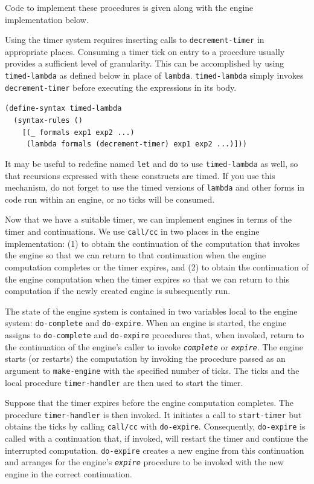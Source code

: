 Code to implement these procedures is given along with the engine
implementation below.


Using the timer system requires inserting calls to \texttt{decrement-timer} in
appropriate places.
Consuming a timer tick on entry to a procedure usually provides a sufficient
level of granularity.
This can be accomplished by using \texttt{timed-lambda} as defined below
in place of \texttt{lambda}.
\texttt{timed-lambda} simply invokes \texttt{decrement-timer} before executing the
expressions in its body.


\begin{alltt}
(define-syntax timed-lambda
  (syntax-rules ()
    [(\_{} formals exp1 exp2 ...)
     (lambda formals (decrement-timer) exp1 exp2 ...)]))
\end{alltt}


It may be useful to redefine named \texttt{let} and \texttt{do} to use \texttt{timed-lambda}
as well, so that recursions expressed with these constructs are
timed.
If you use this mechanism, do not forget to use the timed versions of
\texttt{lambda} and other forms in code run within an engine, or no
ticks will be consumed.


Now that we have a suitable timer, we can implement engines in terms of
the timer and continuations.
We use \label{examples_s98}\texttt{call/cc} in two places in the engine
implementation: (1) to obtain the continuation of the computation that invokes
the engine so that we can return to that continuation when the engine
computation completes or the timer expires, and (2) to obtain the continuation
of the engine computation when the timer expires so that we can return
to this computation if the newly created engine is subsequently run.


The state of the engine system is contained in two variables local to
the engine system: \texttt{do-complete} and \texttt{do-expire}.
When an engine is started, the engine assigns to \texttt{do-complete} and
\texttt{do-expire} procedures
that, when invoked, return to the continuation of the engine's caller
to invoke \texttt{\textit{complete}} or \texttt{\textit{expire}}.
The engine starts (or restarts) the computation by invoking
the procedure passed as an argument to \texttt{make-engine} with the specified
number of ticks.
The ticks and the local procedure \texttt{timer-handler} are then used to
start the timer.


Suppose that the timer expires before the engine computation completes.
The procedure \texttt{timer-handler} is then invoked.
It initiates a call to \texttt{start-timer} but obtains the ticks by calling
\texttt{call/cc} with \texttt{do-expire}.
Consequently, \texttt{do-expire} is
called with a continuation that, if invoked,
will restart the timer and continue the interrupted computation.
\texttt{do-expire} creates a new engine from this continuation and
arranges for the engine's \texttt{\textit{expire}} procedure to be invoked with the new
engine in the correct continuation.


